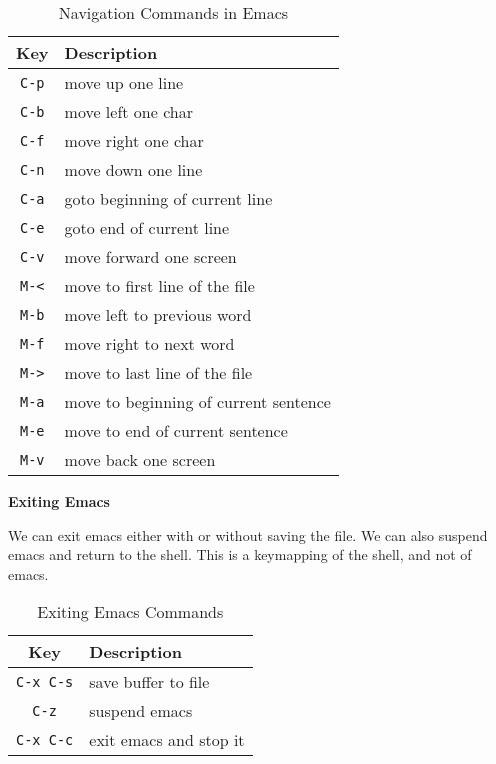 \begin{table}[h!]
  \caption{Navigation Commands in Emacs}
  \begin{tabular}{c l}
    \toprule
    Key & Description \\
    \midrule
    \lstinline|C-p| & move up one line \\
    \lstinline|C-b| & move left one char \\
    \lstinline|C-f| & move right one char \\
    \lstinline|C-n| & move down one line \\
    \lstinline|C-a| & goto beginning of current line \\
    \lstinline|C-e| & goto end of current line \\
    \lstinline|C-v| & move forward one screen \\
    \lstinline|M-<| & move to first line of the file \\
    \lstinline|M-b| & move left to previous word \\
    \lstinline|M-f| & move right to next word \\
    \lstinline|M->| & move to last line of the file \\
    \lstinline|M-a| & move to beginning of current sentence \\
    \lstinline|M-e| & move to end of current sentence \\
    \lstinline|M-v| & move back one screen \\
    \bottomrule
  \end{tabular}
\end{table}

\textbf{Exiting Emacs}

We can exit emacs either with or without saving the file.
We can also suspend emacs and return to the shell.
This is a keymapping of the shell, and not of emacs.

\begin{table}[h!]
  \caption{Exiting Emacs Commands}
  \begin{tabular}{c l}
    \toprule
    Key & Description \\
    \midrule
    \lstinline|C-x C-s| & save buffer to file \\
    \lstinline|C-z| & suspend emacs \\
    \lstinline|C-x C-c| & exit emacs and stop it \\
    \bottomrule
  \end{tabular}
\end{table}

